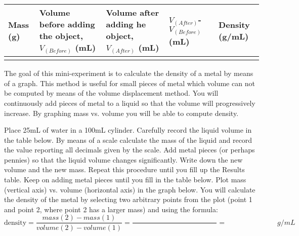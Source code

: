 \documentclass[main.tex]{subfiles}
\begin{document}
\begin{center}\resizebox{18cm}{!} {
 \begin{tabular}{ |p{2cm}|p{3.5cm}|p{5.5cm}|p{3.5cm}|p{2.5cm}|  }
\hline
    Mass (g) &  Volume before adding the object, $V_{(Before)}$ (mL) & Volume after adding he object, $V_{(After)}$ (mL)& $V_{(After)}$-$V_{(Before)}$ (mL)& Density (g/mL)         \\
\hline
   \vspace{0cm}\vspace{5cm} &     &   &&         \\
\hline
\end{tabular} 
}\end{center}
\vspace{0.2cm}{\large \bfseries 5. Density by graphing }
The goal of this mini-experiment is to calculate the density of a metal by means of a graph. This method is useful for small pieces of metal which volume can not be computed by means of the volume displacement method. You will continuously add pieces of metal to a liquid so that the volume will progressively increase.  By graphing mass vs. volume you will be able to compute density.
\begin{steps}
        \newstep[]  Place 25mL of water in a 100mL cylinder. Carefully record the liquid volume in the table below.
    \newstep[] By means of a scale calculate the mass of the liquid and record the value reporting all decimals given by the scale.    
    \newstep[] Add metal pieces (or perhaps pennies) so that the liquid volume changes significantly. Write down the new volume and the new mass. Repeat this procedure until you fill up the Results table.
            \newstep[] Keep on adding metal pieces until you fill in the table below.
               \newstep[] Plot mass (vertical axis) vs. volume (horizontal axis) in the graph below.
  \newstep[] You will calculate the density of the metal by selecting two arbitrary points from the plot (point 1 and point 2, where point 2 has a larger mass) and using the formula:
\begin{equation*}
\text{density}=\frac{mass(2)-mass(1)}{volume(2)-volume(1)}=\frac{\hspace{5cm}}{}=\hspace{3cm} g/mL
\end{equation*}
\end{steps}
\end{document}
